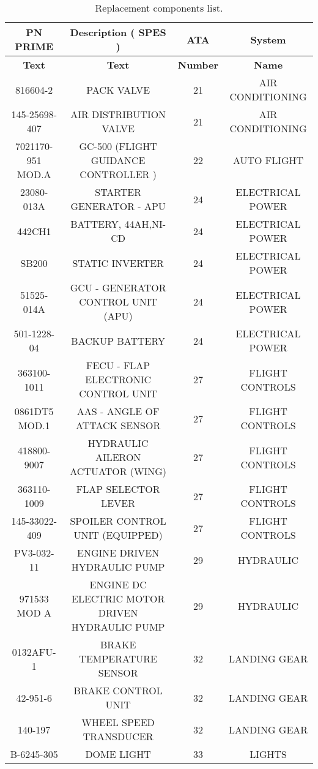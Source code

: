\begin{table}[htbp]
  \centering
  \tiny
  \caption{Replacement components list.}
    \begin{tabular}{cccc}
    \toprule
    \textbf{PN PRIME} & \textbf{Description ( SPES )} & \textbf{ATA} & \textbf{System} \\
    \midrule
    \textbf{Text} & \textbf{Text} & \textbf{Number} & \textbf{Name} \\
    816604-2 & PACK VALVE & 21    & AIR CONDITIONING \\
    145-25698-407 & AIR DISTRIBUTION VALVE & 21    & AIR CONDITIONING \\
    7021170-951 MOD.A & GC-500 (FLIGHT GUIDANCE CONTROLLER ) & 22    & AUTO FLIGHT \\
    23080-013A & STARTER GENERATOR - APU & 24    & ELECTRICAL POWER \\
    442CH1 & BATTERY, 44AH,NI-CD & 24    & ELECTRICAL POWER \\
    SB200 & STATIC INVERTER & 24    & ELECTRICAL POWER \\
    51525-014A & GCU - GENERATOR CONTROL UNIT (APU) & 24    & ELECTRICAL POWER \\
    501-1228-04 & BACKUP BATTERY & 24    & ELECTRICAL POWER \\
    363100-1011 & FECU - FLAP ELECTRONIC CONTROL UNIT & 27    & FLIGHT CONTROLS \\
    0861DT5 MOD.1 & AAS - ANGLE OF ATTACK SENSOR & 27    & FLIGHT CONTROLS \\
    418800-9007 & HYDRAULIC AILERON ACTUATOR (WING) & 27    & FLIGHT CONTROLS \\
    363110-1009 & FLAP SELECTOR LEVER & 27    & FLIGHT CONTROLS \\
    145-33022-409 & SPOILER CONTROL UNIT (EQUIPPED) & 27    & FLIGHT CONTROLS \\
    PV3-032-11 & ENGINE DRIVEN HYDRAULIC PUMP & 29    & HYDRAULIC \\
    971533 MOD A & ENGINE DC ELECTRIC MOTOR DRIVEN HYDRAULIC PUMP & 29    & HYDRAULIC \\
    0132AFU-1 & BRAKE TEMPERATURE SENSOR & 32    & LANDING GEAR \\
    42-951-6 & BRAKE CONTROL UNIT  & 32    & LANDING GEAR \\
    140-197 & WHEEL SPEED TRANSDUCER  & 32    & LANDING GEAR \\
    B-6245-305 & DOME LIGHT & 33    & LIGHTS \\

\end{tabular}
\end{table}

